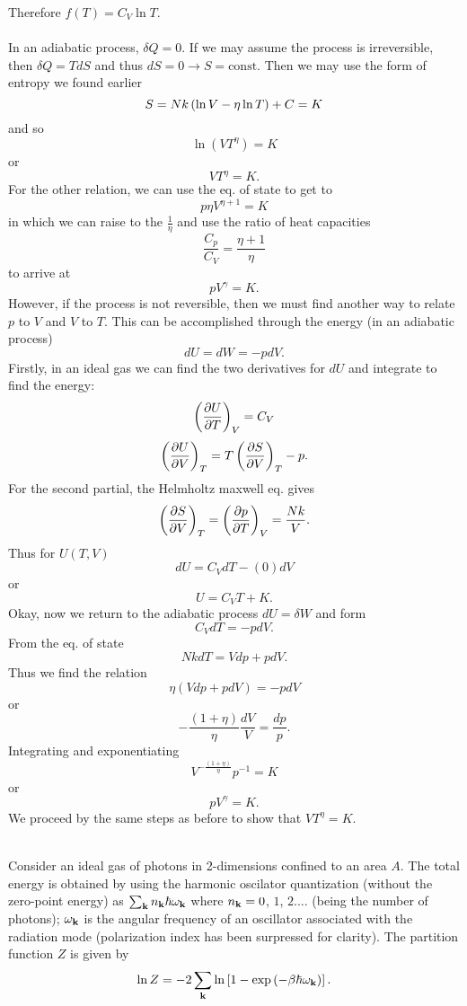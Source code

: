 \documentclass[10pt,letterpaper]{article}
\begin{document}
	Therefore $f(T)= C_V\ln T$. 
	\\ \\
	In an adiabatic process, $\delta Q = 0$. If we may assume the process is irreversible, then $\delta Q = TdS$
	and thus $dS = 0 \to S = \text{const}$. Then we may use the form of entropy we found earlier
	\[
		S = Nk\plr{\ln V-\eta\ln T} + C = K
	\]
	and so
	\[
		\ln(VT^\eta) = K
	\]
	or
	\[
		VT^\eta = K.
	\]
	For the other relation, we can use the eq. of state to get to
	\[
		p\eta V^{\eta+1} = K
	\]
	in which we can raise to the $\frac{1}{\eta}$ and use the ratio of heat capacities 
	\[
		\frac{C_p}{C_V} = \frac{\eta+1}{\eta}
	\]
	to arrive at
	\[
		pV^\gamma = K.
	\]
	However, if the process is not reversible, then we must find another way to relate $p$ to $V$ and $V$ to $T$. This
	can be accomplished through the energy (in an adiabatic process)
	\[
		dU = dW = -pdV.
	\]
	Firstly, in an ideal gas we can find the two derivatives for $dU$ and integrate to find the energy:
	\[
		\plr{\pdiff[U]{T}}_V = C_V
	\]
	\[
		\plr{\pdiff[U]{V}}_T = T\plr{\pdiff[S]{V}}_T-p.
	\]
	For the second partial, the Helmholtz maxwell eq. gives 
	\[
		\plr{\pdiff[S]{V}}_T = \plr{\pdiff[p]{T}}_V = \frac{Nk}{V}.
	\]
	Thus for $U(T,V)$ 
	\[
		dU = C_VdT-(0)dV
	\]
	or
	\[
		U = C_VT +K.
	\]
	Okay, now we return to the adiabatic process $dU = \delta W$ and form
	\[
		C_VdT = -pdV.
	\]
	From the eq. of state
	\[
		NkdT = Vdp+pdV.
	\]
	Thus we find the relation
	\[
		\eta(Vdp+pdV) = -pdV
	\]
	or
	\[
		-\frac{(1+\eta)}{\eta}\frac{dV}{V} = \frac{dp}{p}.
	\]
	Integrating and exponentiating
	\[
		V^{-\frac{(1+\eta)}{\eta}}p^{-1} = K
	\]
	or
	\[
		pV^\gamma = K.
	\]
	We proceed by the same steps as before to show that $VT^\eta = K$. 
	\\ \\
	
	\item
	Consider an ideal gas of photons in 2-dimensions confined to an area $A$. The total energy is obtained by using 
	the harmonic oscilator quantization (without the zero-point energy) as $\sum_{\vect k} n_{\vect k}
	\h\omega_{\vect k}$ where $n_\vect k =0$, $1$, $2....$ (being the number of photons); $\omega_{\vect k}$ is
	the angular frequency of an oscillator associated with the radiation mode (polarization index has been 
	surpressed for clarity). The partition function $Z$ is given by
	\[
		\ln Z = -2\sum_{\vect k}\ln\blr{1-\exp\plr{-\beta\h\omega_{\vect k}}}.
	\]
	
\end{document}
